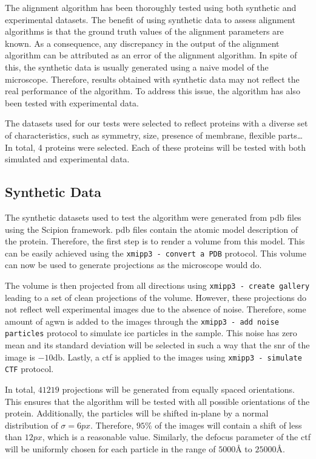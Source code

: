 \documentclass[../main.tex]{subfiles}
\begin{document}
The alignment algorithm has been thoroughly tested using both synthetic and experimental datasets. The benefit of using synthetic data to assess alignment algorithms is that the ground truth values of the alignment parameters are known. As a consequence, any discrepancy in the output of the alignment algorithm can be attributed as an error of the alignment algorithm. In spite of this, the synthetic data is usually generated using a naive model of the microscope. Therefore, results obtained with synthetic data may not reflect the real performance of the algorithm. To address this issue, the algorithm has also been tested with experimental data.

The datasets used for our tests were selected to reflect proteins with a diverse set of characteristics, such as symmetry, size, presence of membrane, flexible parts\dots In total, 4 proteins were selected. Each of these proteins will be tested with both simulated and experimental data.

\subsection{Synthetic Data}
The synthetic datasets used to test the algorithm were generated from \gls{pdb} files using the Scipion framework\cite{delarosa2016}. \Gls{pdb} files contain the atomic model description of the protein. Therefore, the first step is to render a volume from this model. This can be easily achieved using the \texttt{xmipp3 - convert a PDB} protocol. This volume can now be used to generate projections as the microscope would do. 

The volume is then projected from all directions using \texttt{xmipp3 - create gallery} leading to a set of clean projections of the volume. However, these projections do not reflect well experimental images due to the absence of noise. Therefore, some amount of \gls{agwn} is added to the images through the \texttt{xmipp3 - add noise particles} protocol to simulate ice particles in the sample. This noise has zero mean and its standard deviation will be selected in such a way that the \gls{snr} of the image is $-10 \si{\decibel}$. Lastly, a \gls{ctf} is applied to the images using \texttt{xmipp3 - simulate CTF} protocol. 

In total, $41219$ projections will be generated from equally spaced orientations. This ensures that the algorithm will be tested with all possible orientations of the protein. Additionally, the particles will be shifted in-plane by a normal distribution of $\sigma=6\si{px}$. Therefore, $95\si{\percent}$ of the images will contain a shift of less than $12 \si{px}$, which is a reasonable value. Similarly, the defocus parameter of the \gls{ctf} will be uniformly chosen for each particle in the range of $5000 \si{\angstrom}$ to $25000 \si{\angstrom}$.
\end{document}
